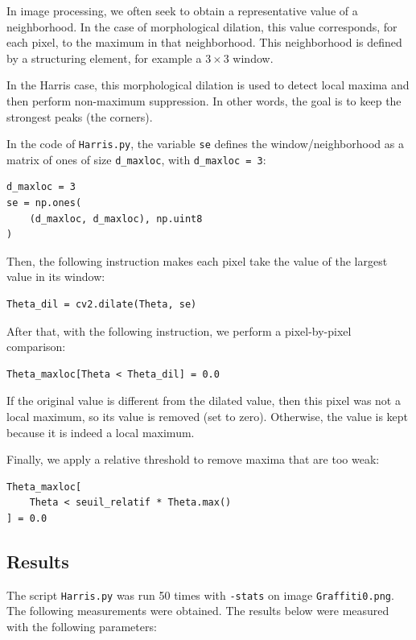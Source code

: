 In image processing, we often seek to obtain a
representative value of a neighborhood.
In the case of morphological dilation, this value corresponds,
for each pixel, to the maximum in that neighborhood.
This neighborhood is defined by a structuring element,
for example a $3 \times 3$ window.

In the Harris case, this morphological dilation is used to
detect local maxima and then perform non-maximum suppression.
In other words, the goal is to keep the strongest peaks (the corners).

In the code of \texttt{Harris.py},
the variable \texttt{se} defines the window/neighborhood as a matrix
of ones of size \texttt{d\_maxloc}, with \texttt{d\_maxloc = 3}:

\begin{verbatim}
d_maxloc = 3
se = np.ones(
    (d_maxloc, d_maxloc), np.uint8
)
\end{verbatim}

Then, the following instruction makes each pixel take the value
of the largest value in its window:

\begin{verbatim}
Theta_dil = cv2.dilate(Theta, se)
\end{verbatim}

After that, with the following instruction, we perform a pixel-by-pixel
comparison:

\begin{verbatim}
Theta_maxloc[Theta < Theta_dil] = 0.0
\end{verbatim}

If the original value is different from the dilated value, then this pixel
was not a local maximum, so its value is removed (set to zero).
Otherwise, the value is kept because it is indeed a local maximum.

Finally, we apply a relative threshold to remove maxima that are too weak:

\begin{verbatim}
Theta_maxloc[
    Theta < seuil_relatif * Theta.max()
] = 0.0
\end{verbatim}

\subsection{Results}

The script \texttt{Harris.py} was run 50 times with \texttt{-stats}
on image \texttt{Graffiti0.png}. The following measurements were obtained.
The results below were measured with the following parameters:

